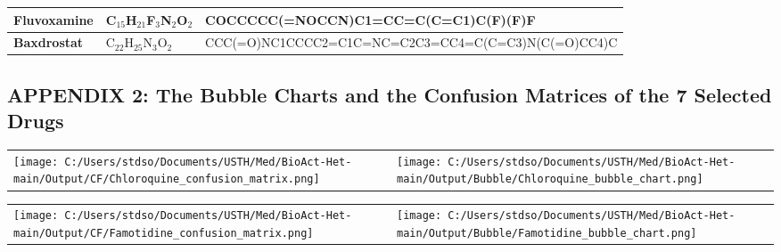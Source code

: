 \documentclass[conference]{IEEEtran}
\begin{document}
\begin{table}[h]
\begin{tabular}{|>{\bfseries}l|l|p{10cm}|}
    \hline
    Fluvoxamine                              & C$_{15}$H$_{21}$F$_3$N$_2$O$_2$        & COCCCCC(=NOCCN)C1=CC=C(C=C1)C(F)(F)F                                                                                                                                                                                                                                                                                                                                                                                                                                                                                                                                            \\
    \hline
    Baxdrostat                               & C$_{22}$H$_{25}$N$_3$O$_2$             & CCC(=O)NC1CCCC2=C1C=NC=C2C3=CC4=C(C=C3)N(C(=O)CC4)C                                                                                                                                                                                                                                                                                                                                                                                                                                                                                                                             \\
    \hline
  \end{tabular}
\end{table}
\newpage

\subsection*{\centering APPENDIX 2: The Bubble Charts and the Confusion Matrices of the 7 Selected Drugs}

\noindent
\begin{center}
  \begin{tabular}{p{} p{}}
    \texttt{[image: C:/Users/stdso/Documents/USTH/Med/BioAct-Het-main/Output/CF/Chloroquine\_confusion\_matrix.png]} & \texttt{[image: C:/Users/stdso/Documents/USTH/Med/BioAct-Het-main/Output/Bubble/Chloroquine\_bubble\_chart.png]} \\
  \end{tabular}
  \vspace{10pt}
\end{center}

\noindent
\begin{center}
  \begin{tabular}{p{} p{}}
    \texttt{[image: C:/Users/stdso/Documents/USTH/Med/BioAct-Het-main/Output/CF/Famotidine\_confusion\_matrix.png]} & \texttt{[image: C:/Users/stdso/Documents/USTH/Med/BioAct-Het-main/Output/Bubble/Famotidine\_bubble\_chart.png]} \\
  \end{tabular}
  \vspace{10pt}
\end{center}
\end{document}
